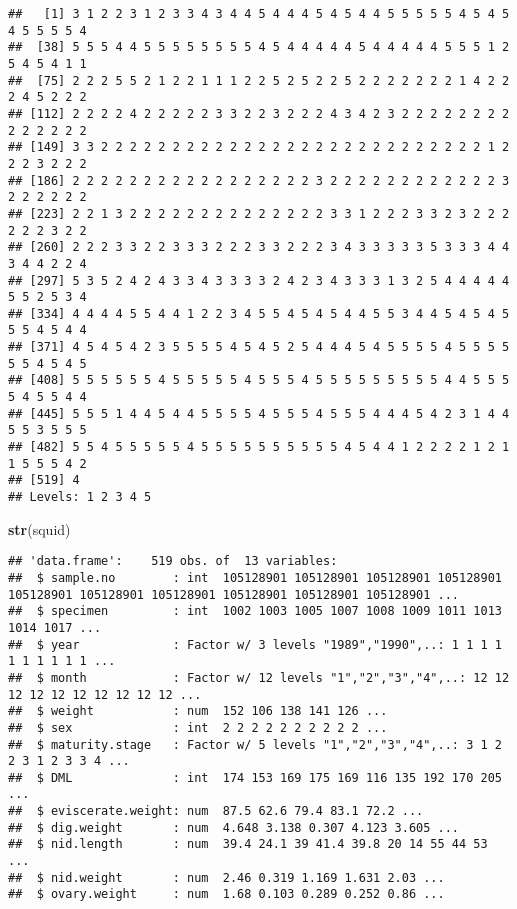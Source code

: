 \documentclass[
]{article}
\newenvironment{Shaded}{\begin{snugshade}}{\end{snugshade}}
\newcommand{\FunctionTok}[1]{\textcolor[rgb]{0.13,0.29,0.53}{\textbf{#1}}}
\newcommand{\NormalTok}[1]{#1}
\begin{document}
\begin{verbatim}
##   [1] 3 1 2 2 3 1 2 3 3 4 3 4 4 5 4 4 4 5 4 5 4 4 5 5 5 5 5 4 5 4 5 4 5 5 5 5 4
##  [38] 5 5 5 4 4 5 5 5 5 5 5 5 5 4 5 4 4 4 4 4 5 4 4 4 4 4 5 5 5 1 2 5 4 5 4 1 1
##  [75] 2 2 2 5 5 2 1 2 2 1 1 1 2 2 5 2 5 2 2 5 2 2 2 2 2 2 2 1 4 2 2 2 4 5 2 2 2
## [112] 2 2 2 2 4 2 2 2 2 2 3 3 2 2 3 2 2 2 4 3 4 2 3 2 2 2 2 2 2 2 2 2 2 2 2 2 2
## [149] 3 3 2 2 2 2 2 2 2 2 2 2 2 2 2 2 2 2 2 2 2 2 2 2 2 2 2 2 2 1 2 2 2 3 2 2 2
## [186] 2 2 2 2 2 2 2 2 2 2 2 2 2 2 2 2 2 3 2 2 2 2 2 2 2 2 2 2 2 2 3 2 2 2 2 2 2
## [223] 2 2 1 3 2 2 2 2 2 2 2 2 2 2 2 2 2 2 3 3 1 2 2 2 3 3 2 3 2 2 2 2 2 2 3 2 2
## [260] 2 2 2 3 3 2 2 3 3 3 2 2 2 3 3 2 2 2 3 4 3 3 3 3 3 5 3 3 3 4 4 3 4 4 2 2 4
## [297] 5 3 5 2 4 2 4 3 3 4 3 3 3 3 2 4 2 3 4 3 3 3 1 3 2 5 4 4 4 4 4 5 5 2 5 3 4
## [334] 4 4 4 4 5 5 4 4 1 2 2 3 4 5 5 4 5 4 5 4 4 5 5 3 4 4 5 4 5 4 5 5 5 4 5 4 4
## [371] 4 5 4 5 4 2 3 5 5 5 5 4 5 4 5 2 5 4 4 4 5 4 5 5 5 5 4 5 5 5 5 5 5 4 5 4 5
## [408] 5 5 5 5 5 5 4 5 5 5 5 5 4 5 5 5 4 5 5 5 5 5 5 5 5 5 4 4 5 5 5 5 4 5 5 4 4
## [445] 5 5 5 1 4 4 5 4 4 5 5 5 5 4 5 5 5 4 5 5 5 4 4 4 5 4 2 3 1 4 4 5 5 3 5 5 5
## [482] 5 5 4 5 5 5 5 5 4 5 5 5 5 5 5 5 5 5 5 4 5 4 4 1 2 2 2 2 1 2 1 1 5 5 5 4 2
## [519] 4
## Levels: 1 2 3 4 5
\end{verbatim}

\begin{Shaded}
\begin{Highlighting}[]
\FunctionTok{str}\NormalTok{(squid)}
\end{Highlighting}
\end{Shaded}

\begin{verbatim}
## 'data.frame':    519 obs. of  13 variables:
##  $ sample.no        : int  105128901 105128901 105128901 105128901 105128901 105128901 105128901 105128901 105128901 105128901 ...
##  $ specimen         : int  1002 1003 1005 1007 1008 1009 1011 1013 1014 1017 ...
##  $ year             : Factor w/ 3 levels "1989","1990",..: 1 1 1 1 1 1 1 1 1 1 ...
##  $ month            : Factor w/ 12 levels "1","2","3","4",..: 12 12 12 12 12 12 12 12 12 12 ...
##  $ weight           : num  152 106 138 141 126 ...
##  $ sex              : int  2 2 2 2 2 2 2 2 2 2 ...
##  $ maturity.stage   : Factor w/ 5 levels "1","2","3","4",..: 3 1 2 2 3 1 2 3 3 4 ...
##  $ DML              : int  174 153 169 175 169 116 135 192 170 205 ...
##  $ eviscerate.weight: num  87.5 62.6 79.4 83.1 72.2 ...
##  $ dig.weight       : num  4.648 3.138 0.307 4.123 3.605 ...
##  $ nid.length       : num  39.4 24.1 39 41.4 39.8 20 14 55 44 53 ...
##  $ nid.weight       : num  2.46 0.319 1.169 1.631 2.03 ...
##  $ ovary.weight     : num  1.68 0.103 0.289 0.252 0.86 ...
\end{verbatim}
\end{document}

